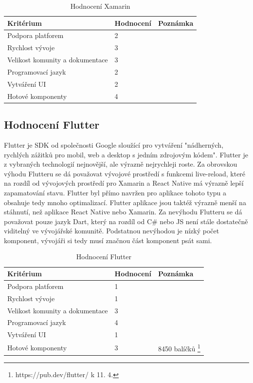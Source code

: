 \begin{table}[H]
	\begin{tabularx}{\textwidth}{| X | X | X |}
		\hline
		Kritérium                       & Hodnocení & Poznámka \\
		\hline
		Podpora platforem & 2 &          \\
		\hline
		Rychlost vývoje                 & 3 &          \\
		\hline
		Velikost komunity a dokumentace & 3 &          \\
		\hline
		Programovací jazyk              & 2 &          \\
		\hline
		Vytváření UI                    & 2 &          \\
		\hline
		Hotové komponenty               & 4 & \\
		\hline
	\end{tabularx}
	\caption{Hodnocení Xamarin}
\end{table}

\subsection{Hodnocení Flutter}


Flutter je SDK od společnosti Google sloužící pro vytváření "nádherných, rychlých zážitků pro mobil, web a desktop s jedním zdrojovým kódem". Flutter je z vybraných technologií nejnovější, ale výrazně nejrychleji roste. Za obrovskou výhodu Flutteru se dá považovat vývojové prostředí s funkcemi live-reload, které na rozdíl od vývojových prostředí pro Xamarin a React Native má výrazně lepší zapamatování stavu. Flutter byl přímo navržen pro aplikace tohoto typu a obsahuje tedy mnoho optimalizací. Flutter aplikace jsou taktéž výrazně menší na stáhnutí, než aplikace React Native nebo Xamarin. Za nevýhodu Flutteru se dá považovat pouze jazyk Dart, který na rozdíl od C\# nebo JS není stále dostatečně viditelný ve vývojářské komunitě. Podstatnou nevýhodou je nízký počet komponent, vývojáři si tedy musí značnou část komponent psát sami.

\begin{table}[h]
	\begin{tabularx}{\textwidth}{| X | X | X |}
		\hline
		Kritérium                       & Hodnocení & Poznámka \\
		\hline
		Podpora platforem               & 1 &          \\
		\hline
		Rychlost vývoje                 & 1 &          \\
		\hline
		Velikost komunity a dokumentace & 3 &          \\
		\hline
		Programovací jazyk              & 4 &          \\
		\hline
		Vytváření UI                    & 1 &          \\
		\hline
		Hotové komponenty               & 3 & 8450 balíčků \footnote{https://pub.dev/flutter/ k 11. 4.} \\
		\hline    
	\end{tabularx}
	\caption{Hodnocení Flutter}
\end{table}

